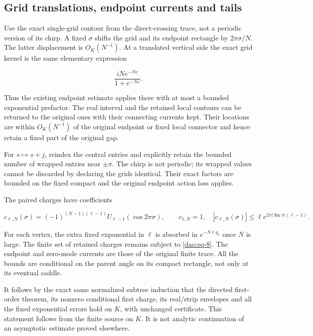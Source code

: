 \subsection{Grid translations, endpoint currents and tails}\label{dao:sec-3.3}

Use the exact single-grid contour from the direct-crossing trace, not a periodic version of its chirp. A fixed \(\sigma\) shifts the grid and its endpoint rectangle by \(2\pi\sigma/N\). The latter displacement is \(O_K(N^{-1})\). At a translated vertical side the exact grid kernel is the same elementary expression

\begin{equation}\label{dao:eq-11}
\frac{iN e^{-Nv}}{1+e^{-Nv}}.
\end{equation}

Thus the existing endpoint estimate applies there with at most a bounded exponential prefactor. The real interval and the retained local contours can be returned to the original ones with their connecting currents kept. Their locations are within \(O_K(N^{-1})\) of the original endpoint or fixed local connector and hence retain a fixed part of the original gap.

For \(s\mapsto s+j\), reindex the central entries and explicitly retain the bounded number of wrapped entries near \(\pm\pi\). The chirp is not periodic; its wrapped values cannot be discarded by declaring the grids identical. Their exact factors are bounded on the fixed compact and the original endpoint action loss applies.

The paired charges have coefficients

\begin{equation}\label{dao:eq-12}
c_{\ell,N}(\sigma)=(-1)^{(N-1)(\ell-1)}
          U_{\ell-1}(\cos2\pi\sigma),\qquad c_{1,N}=1,
 \quad
 |c_{\ell,N}(\sigma)|\le
       \ell e^{2\pi|\operatorname{Im}\sigma|(\ell-1)}.
\end{equation}

For each vertex, the extra fixed exponential in \(\ell\) is absorbed in \(e^{-N\ell y_v}\) once \(N\) is large. The finite set of retained charges remains subject to \eqref{dao:eq-8}. The endpoint and zero-mode currents are those of the original finite trace. All the bounds are conditional on the parent angle on its compact rectangle, not only at its eventual saddle.

It follows by the exact same normalized subtree induction that the directed first-order theorem, its nonzero conditional first charge, its real/strip envelopes and all the fixed exponential errors hold on \(K\), with unchanged certificate. This statement follows from the finite source on \(K\). It is not analytic continuation of an asymptotic estimate proved elsewhere.

